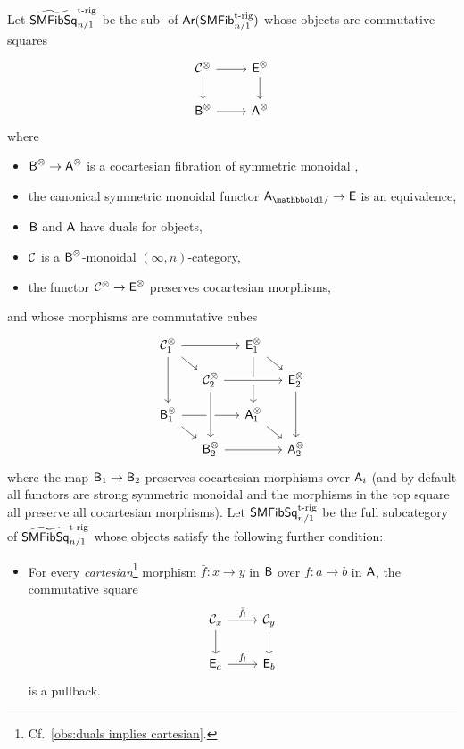 \documentclass[a4paper,11pt]{article}
\begin{document}
\begin{defn}\label{defn:smfibsq}
  Let $\widetilde{\textup{\textsf{SMFibSq}}}^{\text{\textup{t-rig}}}_{n/1}$ be the
   sub-\itcat{} of
   $\textup{\textsf{Ar}}(\textup{\textsf{SMFib}}^{\text{\textup{t-rig}}}_{n/1})$ whose objects are commutative squares
    \[
      \begin{tikzcd}
        \nC^{\otimes} \ar[r] \ar[d] & \oE^{\otimes} \ar[d]
        \\
        \oB^{\otimes} \ar[r] & \oA^{\otimes}
      \end{tikzcd}
    \]
    where
    \begin{itemize}
    \item $\oB^{\otimes} \to \oA^{\otimes}$ is a  cocartesian
      fibration of symmetric monoidal \icats{},
    \item the canonical symmetric monoidal functor $\oA_{\bbone/} \to
      \oE$ is an equivalence,
    \item $\textup{\textsf{B}}$ and $\textup{\textsf{A}}$ have duals for objects,
    \item $\mathcal{C}$ is a $\textup{\textsf{B}}^{\otimes}$-monoidal $(\infty,n)$-category,
    \item the functor $\nC^{\otimes} \to \oE^{\otimes}$ preserves cocartesian
    morphisms,
  \end{itemize}
  and whose morphisms are commutative cubes
  \[
    \begin{tikzcd}[row sep=small,column sep=small]
     \nC_{1}^{\otimes} \ar[rr] \ar[dr] \ar[dd] & & \oE_{1}^{\otimes} \ar[dr] \ar[dd] \\
      & \nC_{2}^{\otimes} \ar[rr,crossing over] & & \oE_{2}^{\otimes} \ar[dd] \\
      \oB_{1}^{\otimes} \ar[rr] \ar[dr] & & \oA_{1}^{\otimes}  \ar[dr] \\
      & \oB_{2}^{\otimes}  \ar[rr]  \ar[uu,leftarrow,crossing over] & & \oA_{2}^{\otimes} 
    \end{tikzcd}
  \]
  where the map $\oB_{1} \to \oB_{2}$ preserves cocartesian morphisms
  over $\textup{\textsf{A}}_{i}$ (and by default all functors are strong symmetric
  monoidal and the morphisms in the top square all preserve all
  cocartesian morphisms).
  Let $\textup{\textsf{SMFibSq}}^{\text{\textup{t-rig}}}_{n/1}$ be the full subcategory of
  $\widetilde{\textup{\textsf{SMFibSq}}}^{\text{\textup{t-rig}}}_{n/1}$ whose objects satisfy the following
  further condition:
  \begin{itemize}
  \item For every \emph{cartesian}\footnote{Cf.~\cref{obs:duals
      implies cartesian}.} morphism $\bar{f} \colon x \to y$ in $\textup{\textsf{B}}$
  over $f \colon a \to b$ in $\textup{\textsf{A}}$, the commutative square
    \[
      \begin{tikzcd}
        \nC_{x} \ar[r, "\bar{f}_{!}"]
        \ar[d] & \nC_{y} \ar[d] \\
        \oE_{a} \ar[r, "f_{!}"] & \oE_{b}
      \end{tikzcd}
    \]
    is a pullback.
  \end{itemize}
\end{defn}
\end{document}
